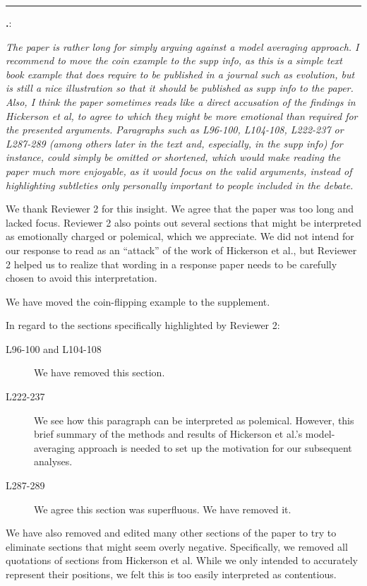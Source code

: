 \documentclass[12pt]{article}
\newcounter{commentCounter}
\newcommand{\revcomment}[1]{{\addtocounter{commentCounter}{1}}
    \medskip \hrule \noindent
\textbf{\arabic{section}.\arabic{commentCounter}}: {\sl #1}\par\xspace}
\newcommand{\response}[1]{{\addtolength{\leftskip}{0.25in} #1\par}\xspace}
\begin{document}
\revcomment{
    The paper is rather long for simply arguing against a model averaging
    approach. I recommend to move the coin example to the supp info, as this is
    a simple text book example that does require to be published in a journal
    such as evolution, but is still a nice illustration so that it should be
    published as supp info to the paper. Also, I think the paper sometimes
    reads like a direct accusation of the findings in Hickerson et al, to agree
    to which they might be more emotional than required for the presented
    arguments. Paragraphs such as L96-100, L104-108, L222-237 or L287-289
    (among others later in the text and, especially, in the supp info) for
    instance, could simply be omitted or shortened, which would make reading
    the paper much more enjoyable, as it would focus on the valid arguments,
    instead of highlighting subtleties only personally important to people
    included in the debate.
    
}
\response{
    We thank Reviewer 2 for this insight. We agree that the paper was too long
    and lacked focus. Reviewer 2 also points out several sections that might be
    interpreted as emotionally charged or polemical, which we appreciate. We
    did not intend for our response to read as an ``attack'' of the work of
    Hickerson et al., but Reviewer 2 helped us to realize that wording in a
    response paper needs to be carefully chosen to avoid this interpretation.

    We have moved the coin-flipping example to the supplement.

    In regard to the sections specifically highlighted by Reviewer 2:
    \begin{description}
        \item[L96-100 and L104-108]
            We have removed this section.
        \item[L222-237]
            We see how this paragraph can be interpreted as polemical. However,
            this brief summary of the methods and results of Hickerson et al.'s
            model-averaging approach is needed to set up the motivation for our
            subsequent analyses.
        \item[L287-289]
            We agree this section was superfluous. We have removed it.
    \end{description}
    
    We have also removed and edited many other sections of the paper to try to
    eliminate sections that might seem overly negative. Specifically, we
    removed all quotations of sections from Hickerson et al. While we only
    intended to accurately represent their positions, we felt this is too
    easily interpreted as contentious.
}
\end{document}
